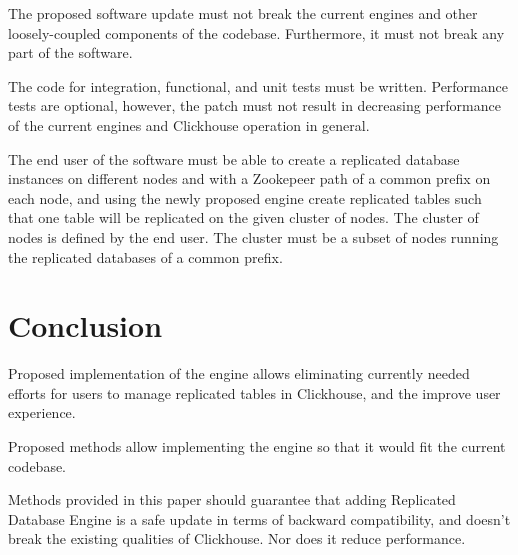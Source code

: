 \documentclass[conference]{IEEEtran}
\begin{document}
The proposed software update must not break the current engines and other loosely-coupled
components of the codebase. Furthermore, it must not break any part of the software.

The code for integration, functional, and unit tests must be written.
Performance tests are optional, however, the patch must not result in decreasing
performance of the current engines and Clickhouse operation in general.

The end user of the software must be able to create a replicated
database instances on different nodes and with a Zookepeer path of a common prefix
on each node, and using the newly proposed engine create replicated tables such that
one table will be replicated on the given cluster of nodes. The cluster of nodes
is defined by the end user. The cluster must be a subset of nodes running the replicated 
databases of a common prefix.

\section{Conclusion}
Proposed implementation of the engine allows eliminating
currently needed efforts for users to manage replicated tables in Clickhouse,
and the improve user experience.

Proposed methods allow implementing the engine so that it would fit the current
codebase.

Methods provided in this paper should guarantee that adding Replicated Database
Engine is a safe update in terms of backward compatibility, and doesn't break 
the existing qualities of Clickhouse. Nor does it reduce performance.
\end{document}

